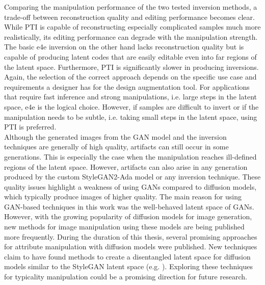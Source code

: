 Comparing the manipulation performance of the two tested inversion methods, a trade-off between reconstruction quality and editing performance becomes clear. While PTI is capable of reconstructing especially complicated samples much more realistically, its editing performance can degrade with the manipulation strength. The basic e4e inversion on the other hand lacks reconstruction quality but is capable of producing latent codes that are easily editable even into far regions of the latent space. Furthermore, PTI is significantly slower in producing inversions. Again, the selection of the correct approach depends on the specific use case and requirements a designer has for the design augmentation tool. For applications that require fast inference and strong manipulations, i.e. large steps in the latent space, e4e is the logical choice. However, if samples are difficult to invert or if the manipulation needs to be subtle, i.e. taking small steps in the latent space, using PTI is preferred. \\
Although the generated images from the GAN model and the inversion techniques are generally of high quality, artifacts can still occur in some generations. This is especially the case when the manipulation reaches ill-defined regions of the latent space. However, artifacts can also arise in any generation produced by the custom StyleGAN2-Ada model or any inversion technique. These quality issues highlight a weakness of using GANs compared to diffusion models, which typically produce images of higher quality. The main reason for using GAN-based techniques in this work was the well-behaved latent space of GANs.  However, with the growing popularity of diffusion models for image generation, new methods for image manipulation using these models are being published more frequently. During the duration of this thesis, several promising approaches for attribute manipulation with diffusion models were published. New techniques claim to have found methods to create a disentangled latent space for diffusion models similar to the StyleGAN latent space (e.g. \cite{dravid2024interpreting}). Exploring these techniques for typicality manipulation could be a promising direction for future research.